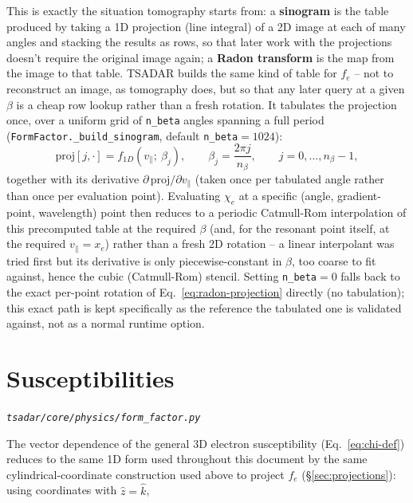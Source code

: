 \documentclass[11pt]{article}
\newcommand{\code}[1]{\texttt{#1}}
\newcommand{\file}[1]{\texttt{#1}}
\begin{document}
This is exactly the situation tomography starts from: a \textbf{sinogram} is the table
produced by taking a 1D projection (line integral) of a 2D image at each of many angles and
stacking the results as rows, so that later work with the projections doesn't require the
original image again; a \textbf{Radon transform} is the map from the image to that table.
TSADAR builds the same kind of table for $f_e$ -- not to reconstruct an image, as tomography
does, but so that any later query at a given $\beta$ is a cheap row lookup rather than a
fresh rotation. It tabulates the projection once, over a uniform grid of \code{n\_beta}
angles spanning a full period (\code{FormFactor.\_build\_sinogram}, default
\code{n\_beta}$=1024$):
\begin{equation}\label{eq:radon-projection}
  \mathrm{proj}[j,\cdot] = f_{1D}(v_\parallel;\ \beta_j), \qquad
  \beta_j = \frac{2\pi j}{n_\beta}, \qquad j=0,\ldots,n_\beta-1,
\end{equation}
together with its derivative $\partial\,\mathrm{proj}/\partial v_\parallel$ (taken once
per tabulated angle rather than once per evaluation point). Evaluating $\chi_e$ at a
specific (angle, gradient-point, wavelength) point then reduces to a periodic Catmull-Rom
interpolation of this precomputed table at the required $\beta$ (and, for the resonant
point itself, at the required $v_\parallel=x_e$) rather than a fresh 2D rotation -- a linear
interpolant was tried first but its derivative is only piecewise-constant in $\beta$, too
coarse to fit against, hence the cubic (Catmull-Rom) stencil. Setting \code{n\_beta}$=0$
falls back to the exact per-point rotation of Eq.~\ref{eq:radon-projection} directly (no
tabulation); this exact path is kept specifically as the reference the tabulated one is
validated against, not as a normal runtime option.

\section{Susceptibilities}\label{sec:formfactor}
\textit{\file{tsadar/core/physics/form\_factor.py}}

The vector dependence of the general 3D electron susceptibility (Eq.~\ref{eq:chi-def})
reduces to the same 1D form used throughout this document by the same
cylindrical-coordinate construction used above to project $f_e$ (\S\ref{sec:projections}):
using coordinates with $\hat{z}=\hat{k}$,
\end{document}
